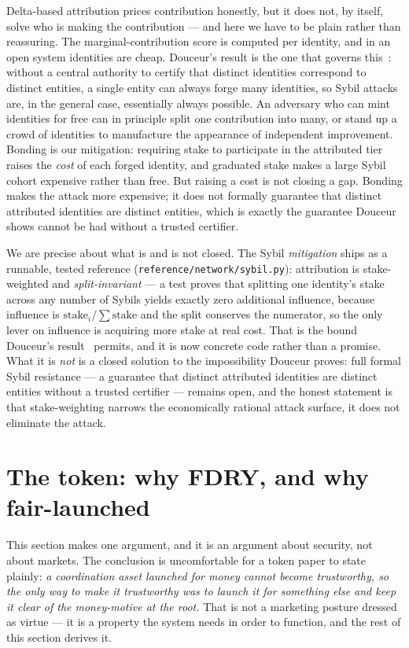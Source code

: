 \documentclass[11pt]{article}
\begin{document}
Delta-based attribution prices contribution honestly, but it does not, by itself,
solve who is making the contribution --- and here we have to be plain rather than
reassuring. The marginal-contribution score is computed per identity, and in an
open system identities are cheap. Douceur's result is the one that governs
this~\cite{sybil}: without a central authority to certify that distinct identities
correspond to distinct entities, a single entity can always forge many identities,
so Sybil attacks are, in the general case, essentially always possible. An adversary
who can mint identities for free can in principle split one contribution into many,
or stand up a crowd of identities to manufacture the appearance of independent
improvement. Bonding is our mitigation: requiring stake to participate in the
attributed tier raises the \emph{cost} of each forged identity, and graduated stake
makes a large Sybil cohort expensive rather than free. But raising a cost is not
closing a gap. Bonding makes the attack more expensive; it does not formally
guarantee that distinct attributed identities are distinct entities, which is
exactly the guarantee Douceur shows cannot be had without a trusted certifier.

We are precise about what is and is not closed. The Sybil
\emph{mitigation} ships as a runnable, tested reference
(\texttt{reference/network/sybil.py}): attribution is stake-weighted and
\emph{split-invariant} --- a test proves that splitting one identity's stake across
any number of Sybils yields exactly zero additional influence, because influence is
$\text{stake}_i/\sum\text{stake}$ and the split conserves the numerator, so the only
lever on influence is acquiring more stake at real cost. That is the bound Douceur's
result~\cite{sybil} permits, and it is now concrete code rather than a promise. What
it is \emph{not} is a closed solution to the impossibility Douceur proves: full
formal Sybil resistance --- a guarantee that distinct attributed identities are
distinct entities without a trusted certifier --- remains open, and the honest
statement is that stake-weighting narrows the economically rational attack surface,
it does not eliminate the attack.

\section{The token: why FDRY, and why fair-launched}

This section makes one argument, and it is an argument about security, not about
markets. The conclusion is uncomfortable for a token paper to state plainly:
\emph{a coordination asset launched for money cannot become trustworthy, so the
only way to make it trustworthy was to launch it for something else and keep it
clear of the money-motive at the root.} That is not a marketing posture dressed as
virtue --- it is a property the system needs in order to function, and the rest of
this section derives it.
\end{document}
